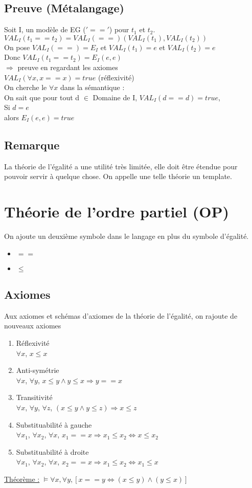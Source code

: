 \subsection*{Preuve (Métalangage)}
\noindent Soit I, un modèle de EG ($'=='$) pour $t_{1}$ et $t_{2}$. \\
$VAL_{I}(t_{1} == t_{2}) = VAL_{I}(==)(VAL_{I}(t_{1}), VAL_{I}(t_{2}))$\\
On pose $VAL_{I}(==) = E_{I}$ et $VAL_{I}(t_{1}) = e$ et $VAL_{I}(t_{2}) = e$\\
Donc $VAL_{I}(t_{1} == t_{2}) =E_{I}(e,e)$ \\
$\Rightarrow$ preuve en regardant les axiomes \\
$ VAL_{I}(\forall x, x==x)= true$ (réflexivité) \\
On cherche le $\forall x$ dans la sémantique : \\
On sait que pour tout d $\in$ Domaine de I, $VAL_{I}(d==d)=true$, \\
Si $d = e$\\
alors $E_{I}(e,e)=true$
\subsection{Remarque}
La théorie de l'égalité a une utilité très limitée, elle doit être étendue pour pouvoir servir à quelque chose. On appelle une telle théorie un template.
\section{Théorie de l'ordre partiel (OP)}
On ajoute un deuxième symbole dans le langage en plus du symbole d'égalité.
\begin{itemize}
	\item $==$
	\item $\leq $
\end{itemize}

\subsection{Axiomes} 
Aux axiomes et schémas d'axiomes de la théorie de l'égalité, on rajoute de nouveaux axiomes
\begin{enumerate}
\item Réflexivité \\$\forall x$, $x\leq x$
\item Anti-symétrie \\$\forall x$, $\forall y$, $ x\leq y \land y\leq x\Rightarrow y==x$
\item Transitivité \\$\forall x$, $\forall y$, $\forall z$, $(x\leq y \land y\leq z) \Rightarrow x\leq z$
\item Substituabilité à gauche \\$\forall x_{1}$, $\forall x_{2}$, $\forall x$,  $x_{1}==x \Rightarrow x_{1}\leq x_{2} \Leftrightarrow x \leq x_{2}$
\item Substituabilité à droite \\$\forall x_{1}$, $\forall x_{2}$, $\forall x$,  $x_{2}==x \Rightarrow x_{1}\leq x_{2} \Leftrightarrow x_{1} \leq x$
\end{enumerate}
\underline{Théorème :} $\models \forall x, \forall y,  [x==y \Leftrightarrow (x\leq y)\land (y \leq x)] $
